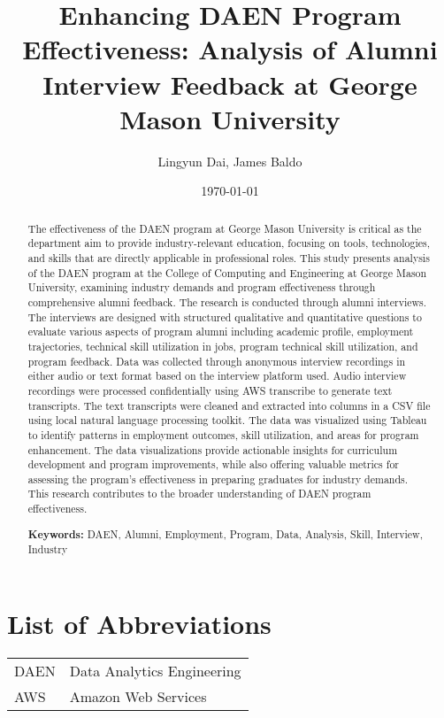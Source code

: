 \documentclass[12pt,a4paper]{article}
\title{\textbf{Enhancing DAEN Program Effectiveness: Analysis of Alumni Interview Feedback at George Mason University}}
\author{Lingyun Dai, James Baldo}
\date{\today}
\begin{document}
\maketitle

\begin{abstract}
The effectiveness of the DAEN program at George 
Mason University is critical as the department aim to provide industry-relevant education, focusing on tools, technologies, and skills that are directly applicable in professional roles. This study presents analysis of the DAEN program at the College of Computing and Engineering at George Mason University, examining industry demands and program effectiveness through comprehensive alumni feedback. The research is conducted through alumni interviews. The interviews are designed with structured qualitative and quantitative questions to evaluate various aspects of program alumni including academic profile, employment trajectories, technical skill utilization in jobs, program technical skill utilization, and program feedback. Data was collected through anonymous interview recordings in either audio or text format based on the interview platform used. Audio interview recordings were processed confidentially using AWS transcribe to generate text transcripts. The text transcripts were cleaned and extracted into columns in a CSV file using local natural language processing toolkit. The data was visualized using Tableau to identify patterns in employment outcomes, 
skill utilization, and areas for program enhancement. The data visualizations provide actionable insights for curriculum development 
and program improvements, while also offering valuable metrics for 
assessing the program's effectiveness in preparing graduates for 
industry demands. This research contributes to the broader 
understanding of DAEN program effectiveness.

\textbf{Keywords:} DAEN, Alumni, Employment, Program, Data,
 Analysis, Skill, Interview, Industry
\end{abstract}

\newpage
\tableofcontents
\newpage

\section*{List of Abbreviations}
\begin{tabular}{ll}
DAEN & Data Analytics Engineering\\
AWS & Amazon Web Services\\
\end{tabular}
\newpage
\end{document}
